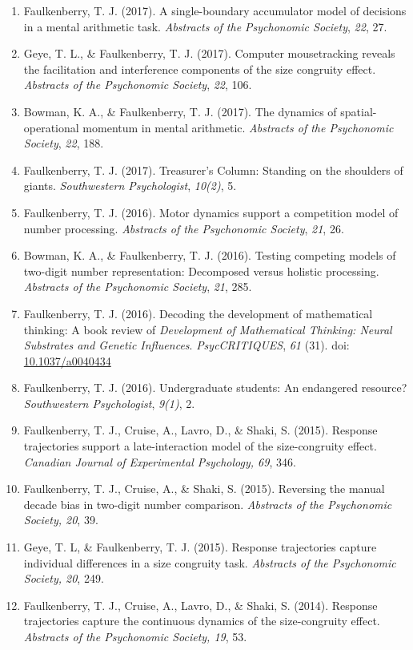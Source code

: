 \documentclass[article,10pt]{article}
\begin{document}
\begin{enumerate}
\item Faulkenberry, T. J. (2017). A single-boundary accumulator model of decisions in a mental arithmetic task. \emph{Abstracts of the Psychonomic Society}, \emph{22}, 27.
\item Geye, T. L., \& Faulkenberry, T. J. (2017). Computer mousetracking reveals the facilitation and interference components of the size congruity effect. \emph{Abstracts of the Psychonomic Society}, \emph{22}, 106.
\item Bowman, K. A., \& Faulkenberry, T. J. (2017). The dynamics of spatial-operational momentum in mental arithmetic. \emph{Abstracts of the Psychonomic Society}, \emph{22}, 188.
\item Faulkenberry, T. J. (2017). Treasurer's Column: Standing on the shoulders of giants. \emph{Southwestern Psychologist}, \emph{10(2)}, 5.
\item Faulkenberry, T. J. (2016). Motor dynamics support a competition model of number processing. \emph{Abstracts of the Psychonomic Society}, \emph{21}, 26.
\item Bowman, K. A., \& Faulkenberry, T. J. (2016). Testing competing models of two-digit number representation: Decomposed versus holistic processing. \emph{Abstracts of the Psychonomic Society}, \emph{21}, 285.
\item Faulkenberry, T. J. (2016). Decoding the development of mathematical thinking: A book review of \emph{Development of Mathematical Thinking: Neural Substrates and Genetic Influences}. \emph{PsycCRITIQUES}, \emph{61} (31). doi: \href{http://dx.doi.org/10.1037/a0040434}{10.1037/a0040434}
\item Faulkenberry, T. J. (2016). Undergraduate students: An endangered resource? \emph{Southwestern Psychologist}, \emph{9(1)}, 2.
\item Faulkenberry, T. J., Cruise, A., Lavro, D., \& Shaki, S. (2015). Response trajectories support a late-interaction model of the size-congruity effect. \emph{Canadian Journal of Experimental Psychology, 69}, 346.
\item Faulkenberry, T. J., Cruise, A., \& Shaki, S. (2015). Reversing the manual decade bias in two-digit number comparison. \emph{Abstracts of the Psychonomic Society, 20}, 39.
\item Geye, T. L, \& Faulkenberry, T. J. (2015). Response trajectories capture individual differences in a size congruity task. \emph{Abstracts of the Psychonomic Society, 20}, 249.
\item Faulkenberry, T. J., Cruise, A., Lavro, D., \& Shaki, S. (2014). Response trajectories capture the continuous dynamics of the size-congruity effect. \emph{Abstracts of the Psychonomic Society, 19}, 53.

\end{enumerate}
\end{document}
